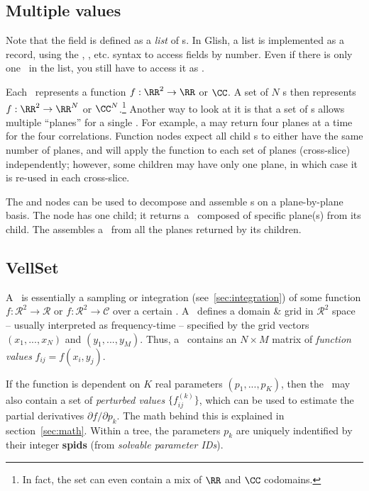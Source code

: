 \subsection{Multiple values}
  
  Note that the  field is defined as a {\em list} of \VellSet{}s. In
  Glish, a list is implemented as a record, using the , ,
  etc. syntax to access fields by number. Even if there is only one \VellSet\
  in the list, you still have to access it as .

  Each \VellSet\ represents a function $f:\RR^2\rightarrow\RR$ or $\CC$. A set
  of $N$ \VellSet{}s then represents $f:\RR^2\rightarrow\RR^{N}$ or
  $\CC^{N}$.\footnote{In fact, the set can even contain a mix of $\RR$ and
  $\CC$ codomains.} Another way to look at it is that a set of \VellSet{}s
  allows multiple ``planes'' for a single \Cells. For example, a 
  may return four planes at a time for the four correlations. Function nodes
  expect all child \Result{}s to either have the same number of planes, and
  will apply the function to each set of planes (cross-slice) independently;
  however, some children may have only one plane, in which case it is re-used
  in each cross-slice.

  The  and  nodes can be used to decompose and
  assemble \Result{}s on a plane-by-plane basis. The \qq{Selector} node has one
  child; it returns a \Result\ composed of specific plane(s) from its child. The
  \qq{Composer} assembles a \Result\ from all the planes returned by its
  children.

\subsection{VellSet}

  A \VellSet\ is essentially a sampling or integration
  (see~\ref{sec:integration}) of some function
  $f:\mathcal{R}^2\rightarrow\mathcal{R}$ or 
  $f:\mathcal{R}^2\rightarrow\mathcal{C}$ over a certain \Cells. A \Cells\ 
  defines a domain \& grid in $\mathcal{R}^2$ space -- usually interpreted as
  frequency-time -- specified by the grid vectors $(x_1,...,x_N)$ and
  $(y_1,...,y_M)$. Thus, a \VellSet\ contains an $N\times M$ matrix of {\em
  function values} $f_{ij}=f(x_i,y_j)$.

  If the function is dependent on $K$ real parameters $(p_1,...,p_K)$, then the
  \VellSet\ may also contain a set of {\em perturbed values}
  $\{f^{(k)}_{ij}\}$, which can be used to estimate the partial derivatives
  $\partial f/\partial p_k$. The math behind this is explained in
  section~\ref{sec:math}. Within a tree, the parameters $p_k$ are uniquely
  indentified by their integer {\bf spids} (from {\em solvable parameter IDs}\/).

